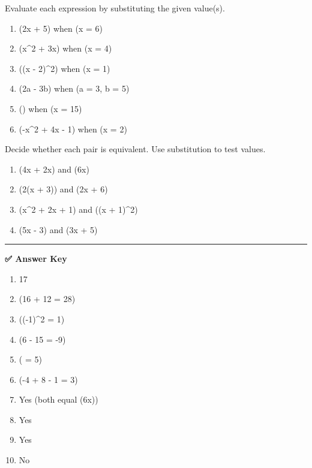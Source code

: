\documentclass[
  letterpaper,
  DIV=11,
  numbers=noendperiod]{scrreprt}
\providecommand{\tightlist}{%
  \setlength{\itemsep}{0pt}\setlength{\parskip}{0pt}}
\begin{document}

Evaluate each expression by substituting the given value(s).

\begin{enumerate}
\def\labelenumi{\arabic{enumi}.}
\tightlist
\item
  (2x + 5) when (x = 6)\\
\item
  (x\^{}2 + 3x) when (x = 4)\\
\item
  ((x - 2)\^{}2) when (x = 1)\\
\item
  (2a - 3b) when (a = 3, b = 5)\\
\item
  () when (x = 15)\\
\item
  (-x\^{}2 + 4x - 1) when (x = 2)
\end{enumerate}

Decide whether each pair is equivalent. Use substitution to test values.

\begin{enumerate}
\def\labelenumi{\arabic{enumi}.}
\setcounter{enumi}{6}
\tightlist
\item
  (4x + 2x) and (6x)\\
\item
  (2(x + 3)) and (2x + 6)\\
\item
  (x\^{}2 + 2x + 1) and ((x + 1)\^{}2)\\
\item
  (5x - 3) and (3x + 5)
\end{enumerate}

\begin{center}\rule{0.5\linewidth}{0.5pt}\end{center}

\textbf{✅ Answer Key}

\begin{enumerate}
\def\labelenumi{\arabic{enumi}.}
\item
  17\\
\item
  (16 + 12 = 28)\\
\item
  ((-1)\^{}2 = 1)\\
\item
  (6 - 15 = -9)\\
\item
  ( = 5)\\
\item
  (-4 + 8 - 1 = 3)
\item
  Yes (both equal (6x))\\
\item
  Yes\\
\item
  Yes\\
\item
  No\\
\end{enumerate}
\end{document}

